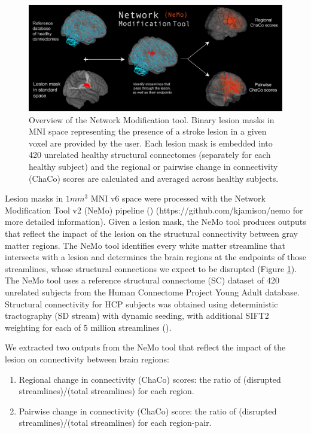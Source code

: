 \documentclass[10pt]{article}
\begin{document}
\begin{figure}[htp]
\centering
\includegraphics[width=1.0\linewidth]{figures/NetworkModificationTool.png}
\caption{Overview of the Network Modification tool. Binary lesion masks in MNI space representing the presence of a stroke lesion in a given voxel are provided by the user. Each lesion mask is embedded into 420 unrelated healthy structural connectomes (separately for each healthy subject) and the regional or pairwise change in connectivity (ChaCo) scores are calculated and averaged across healthy subjects. }
\label{nemotool}
\end{figure}
Lesion masks in $1mm^3$ MNI v6 space were processed with the Network Modification Tool v2 (NeMo) pipeline (\cite{Kuceyeski2013-nk}) (https://github.com/kjamison/nemo for more detailed information). Given a lesion mask, the NeMo tool produces outputs that reflect the impact of the lesion on the structural connectivity between gray matter regions. The NeMo tool identifies every white matter streamline that intersects with a lesion and determines the brain regions at the endpoints of those streamlines, whose structural connections we expect to be disrupted (Figure \ref{nemotool}). The NeMo tool uses a reference structural connectome (SC) dataset of 420 unrelated subjects from the Human Connectome Project Young Adult database. Structural connectivity for HCP subjects was obtained using deterministic tractography (SD stream) with dynamic seeding, with additional SIFT2 weighting for each of 5 million streamlines (\cite{Smith2015-eb}).


We extracted two outputs from the NeMo tool that reflect the impact of the lesion on connectivity between brain regions:

\begin{enumerate}
\item Regional change in connectivity (ChaCo) scores: the ratio of (disrupted streamlines)/(total streamlines) for each region.
\item Pairwise change in connectivity (ChaCo) score: the ratio of (disrupted streamlines)/(total streamlines) for each region-pair.
\end{enumerate}
\end{document}

